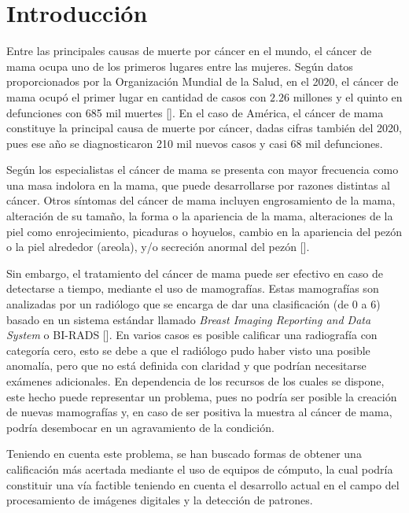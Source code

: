 \chapter*{Introducción}\label{chapter:introduction}

\par Entre las principales causas de muerte por c\'ancer en el mundo, el c\'ancer de mama ocupa uno de los primeros lugares entre las mujeres. Seg\'un datos proporcionados por la Organizaci\'on Mundial de la Salud, en el 2020, el c\'ancer de mama ocup\'o el primer lugar en cantidad de casos con $2.26$ millones y el quinto en defunciones con 685 mil muertes [\cite{16}]. En el caso de Am\'erica, el c\'ancer de mama constituye la principal causa de muerte por c\'ancer, dadas cifras tambi\'en del 2020, pues ese a\~no se diagnosticaron 210 mil nuevos casos y casi 68 mil defunciones.

\par Seg\'un los especialistas el cáncer de mama se presenta con mayor frecuencia como una masa indolora en la mama, que puede desarrollarse por razones distintas al cáncer. Otros síntomas del cáncer de mama incluyen engrosamiento de la mama, alteración de su tamaño, la forma o la apariencia de la mama, alteraciones de la piel como enrojecimiento, picaduras o hoyuelos, cambio en la apariencia del pezón o la piel alrededor (areola), y/o secreción anormal del pezón [\cite{17}].

\par Sin embargo, el tratamiento del c\'ancer de mama puede ser efectivo en caso de detectarse a tiempo, mediante el uso de mamograf\'ias. Estas mamograf\'ias son analizadas por un radi\'ologo que se encarga de dar una clasificaci\'on (de 0 a 6) basado en un sistema est\'andar llamado \textit{Breast Imaging Reporting and Data System} o BI-RADS [\cite{19}]. En varios casos es posible calificar una radiograf\'ia con categor\'ia cero, esto se debe a que el radi\'ologo pudo haber visto una posible anomalía, pero que no está definida con claridad y que podr\'ian necesitarse exámenes adicionales. En dependencia de los recursos de los cuales se dispone, este hecho puede representar un problema, pues no podr\'ia ser posible la creaci\'on de nuevas mamograf\'ias y, en caso de ser positiva la muestra al c\'ancer de mama, podr\'ia desembocar en un agravamiento de la condici\'on.

\par Teniendo en cuenta este problema, se han buscado formas de obtener una calificaci\'on m\'as acertada mediante el uso de equipos de c\'omputo, la cual podr\'ia constituir una v\'ia factible teniendo en cuenta el desarrollo actual en el campo del procesamiento de im\'agenes digitales y la detecci\'on de patrones.

